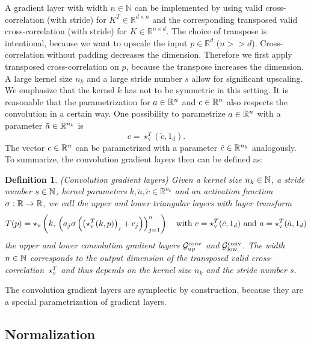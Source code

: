 \documentclass[twoside,a4paper]{article}
\newtheorem{definition}{Definition}
\begin{document}
A gradient layer with width $n \in \mathbb{N}$ can be implemented by 
using valid cross-correlation (with stride) for $K^T \in \mathbb{R}^{d \times n}$ and the
corresponding transposed valid cross-correlation (with stride) for $K \in \mathbb{R}^{n \times d}$.
The choice of transpose is intentional, because we want to upscale the input $p \in \mathbb{R}^d$ ($n >> d$). 
Cross-correlation without padding decreases the dimension. Therefore we first apply 
transposed cross-correlation on $p$, because the transpose increases the dimension.
A large kernel size $n_k$ and a large stride number $s$ allow for significant upscaling.
We emphasize that the kernel $k$ has not to be symmetric in this setting. 
It is reasonable that the parametrization for $a \in \mathbb{R}^n$ and $c \in \mathbb{R}^n$ also respects
the convolution in a certain way.
One possibility to parametrize $a \in \mathbb{R}^n$ with a parameter $\tilde{a} \in \mathbb{R}^{n_k}$ is
\begin{equation*}
	c = \star_{\text{v}}^T(\tilde{c},1_d)
	.
\end{equation*}
The vector $c \in \mathbb{R}^n$ can be parametrized with a parameter $\tilde{c} \in \mathbb{R}^{n_k}$ analogously.
To summarize, the convolution gradient layers then can be defined as:
\begin{definition}
	(Convolution gradient layers)
	Given a kernel size $n_k \in \mathbb{N}$, a stride number $s \in \mathbb{N}$,
	kernel parameters $k,\tilde{a},\tilde{c} \in \mathbb{R}^{n_k}$ and
	an activation function $\sigma : \mathbb{R} \to \mathbb{R}$,
	we call the upper and lower triangular layers with layer transform
	\begin{equation*}
		T(p) = \star_{\text{v}} \left( k, \, \left( a_j \sigma \left( \left( \star_{\text{v}}^T(k,p) \right)_j + c_j \right) \right)_{j=1}^n \right) 
		\quad
		\text{with } c = \star_{\text{v}}^T(\tilde{c},1_d) 
		\text{ and } a = \star_{\text{v}}^T(\tilde{a},1_d)
	\end{equation*}
	the upper and lower convolution gradient layers 
	$\mathcal{G}_{\text{up}}^{\text{conv}}$ and $\mathcal{G}_{\text{low}}^{\text{conv}}$.
	The width $n \in \mathbb{N}$ corresponds to the output dimension of the transposed valid cross-correlation $\star_{\text{v}}^T$
	and thus depends on the kernel size $n_k$ and the stride number $s$.
\end{definition}

The convolution gradient layers are symplectic by construction,
because they are a special parametrization of gradient layers.

\subsection{Normalization}
\end{document}
